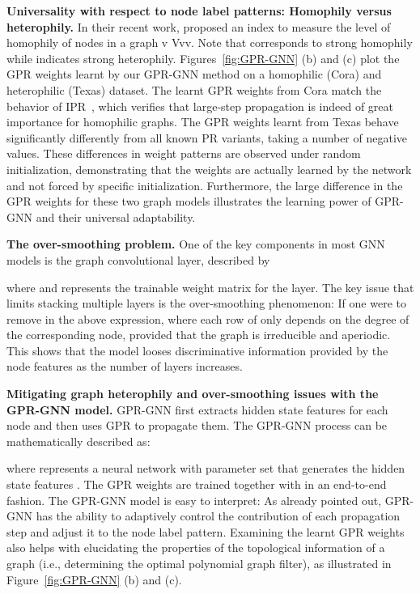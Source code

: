 \documentclass{article} \usepackage{iclr2021_conference,times}
\begin{document}
\textbf{Universality with respect to node label patterns: Homophily versus heterophily. }
In their recent work, \citet{pei2019geom} proposed an index to measure the level of homophily of nodes in a graph v \in Vvv.
Note that  corresponds to strong homophily while  indicates strong heterophily. Figures~\ref{fig:GPR-GNN} (b) and (c) plot the GPR weights learnt by our GPR-GNN method on a homophilic (Cora) and heterophilic (Texas) dataset. The learnt GPR weights from Cora match the behavior of IPR~\citep{li2019optimizing}, which verifies that large-step propagation is indeed of great importance for homophilic graphs. The GPR weights learnt from Texas behave significantly differently from all known PR variants, taking a number of negative values. These differences in weight patterns are observed under random initialization, demonstrating that the weights are actually learned by the network and not forced by specific initialization. Furthermore, the large difference in the GPR weights for these two graph models illustrates the learning power of GPR-GNN and their universal adaptability.


\textbf{The over-smoothing problem.} One of the key components in most GNN models is the graph convolutional layer, described by

where  and  represents the trainable weight matrix for the  layer. The key issue that limits stacking multiple layers is the over-smoothing phenomenon: If one were to remove  in the above expression,  where each row of  only depends on the degree of the corresponding node, provided that the graph is irreducible and aperiodic. This shows that the model looses discriminative information provided by the node features as the number of layers increases.

\textbf{Mitigating graph heterophily and over-smoothing issues with the GPR-GNN model. }GPR-GNN first extracts hidden state features for each node and then uses GPR to propagate them. The GPR-GNN process can be mathematically described as:

where  represents a neural network with parameter set  that generates the hidden state features . The GPR weights  are trained together with  in an end-to-end fashion.
The GPR-GNN model is easy to interpret: As already pointed out, GPR-GNN has the ability to adaptively control the contribution of each propagation step and adjust it to the node label pattern. Examining the learnt GPR weights also helps with elucidating the properties of the topological information of a graph (i.e., determining the optimal polynomial graph filter), as illustrated in Figure~\ref{fig:GPR-GNN} (b) and (c).
\end{document}
